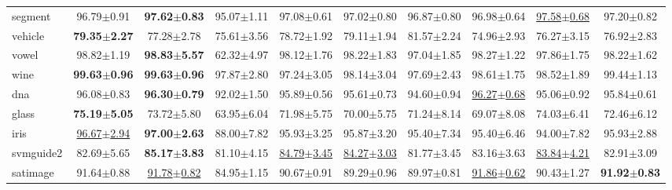 \documentclass{article}
\begin{document}
\begin{table*}[t]
\begin{tabular*}{\linewidth}{@{\extracolsep{-0.24cm}}lccccccccc}
segment            &96.79$\pm$0.91             & \textbf{97.62$\pm$0.83}  &95.07$\pm$1.11      &97.08$\pm$0.61            &97.02$\pm$0.80       &96.87$\pm$0.80    &96.98$\pm$0.64             &\underline{97.58$\pm$0.68}&97.20$\pm$0.82\\
vehicle            &\textbf{79.35$\pm$2.27}             & 77.28$\pm$2.78           &75.61$\pm$3.56      &78.72$\pm$1.92            &79.11$\pm$1.94       &81.57$\pm$2.24    &74.96$\pm$2.93             &76.27$\pm$3.15            &76.92$\pm$2.83\\
vowel              &98.82$\pm$1.19             &\textbf{98.83$\pm$5.57}   &62.32$\pm$4.97      &98.12$\pm$1.76            &98.22$\pm$1.83       &97.04$\pm$1.85    &98.27$\pm$1.22             &97.86$\pm$1.75            &98.22$\pm$1.62\\
wine               &\textbf{99.63$\pm$0.96}    &\textbf{99.63$\pm$0.96}   &97.87$\pm$2.80      &97.24$\pm$3.05            &98.14$\pm$3.04       &97.69$\pm$2.43    &98.61$\pm$1.75             &98.52$\pm$1.89            &99.44$\pm$1.13            \\
dna                &96.08$\pm$0.83             &\textbf{96.30$\pm$0.79}   &92.02$\pm$1.50      &95.89$\pm$0.56            &95.61$\pm$0.73       &94.60$\pm$0.94    &\underline{96.27$\pm$0.68}             &95.06$\pm$0.92            &95.84$\pm$0.61\\
glass              &\textbf{75.19$\pm$5.05}    & 73.72$\pm$5.80           &63.95$\pm$6.04      &71.98$\pm$5.75            &70.00$\pm$5.75       &71.24$\pm$8.14    &69.07$\pm$8.08             &74.03$\pm$6.41            &72.46$\pm$6.12\\
iris               &\underline{96.67$\pm$2.94} &\textbf{97.00$\pm$2.63}   &88.00$\pm$7.82      &95.93$\pm$3.25            &95.87$\pm$3.20       &95.40$\pm$7.34    &95.40$\pm$6.46             &94.00$\pm$7.82            &95.93$\pm$2.88\\
svmguide2          &82.69$\pm$5.65             &\textbf{85.17$\pm$3.83}   &81.10$\pm$4.15      &\underline{84.79$\pm$3.45}&\underline{84.27$\pm$3.03}  &81.77$\pm$3.45    &83.16$\pm$3.63             &\underline{83.84$\pm$4.21}            &82.91$\pm$3.09\\
satimage           &91.64$\pm$0.88             &\underline{91.78$\pm$0.82}&84.95$\pm$1.15      &90.67$\pm$0.91            &89.29$\pm$0.96       &89.97$\pm$0.81    &\underline{91.86$\pm$0.62} &90.43$\pm$1.27            &\textbf{91.92$\pm$0.83}\\
\bottomrule
\end{tabular*}
\vspace{-0.5cm}
\end{table*}
\end{document}
